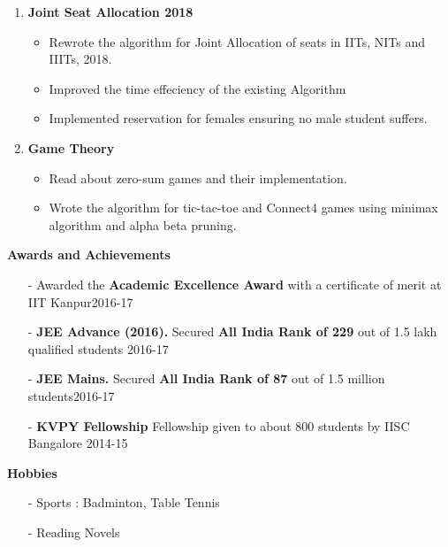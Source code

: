 \documentclass{article}
\begin{document}
\begin{flushleft}
\begin{enumerate}
  \item \textbf{Joint Seat Allocation 2018} \\
  \begin{itemize}
      \item Rewrote the algorithm for Joint Allocation of seats in IITs, NITs and IIITs, 2018.
      \item Improved the time effeciency of the existing Algorithm
      \item Implemented reservation for females ensuring no male student suffers.
  \end{itemize}
  \item \textbf{Game Theory} \\
  \begin{itemize}
      \item Read about zero-sum games and their implementation.
      \item Wrote the algorithm for tic-tac-toe and Connect4 games using minimax algorithm and alpha beta pruning.
  \end{itemize}
\end{enumerate}
\vspace{7mm}
\textbf{Awards and Achievements} \\
\begin{itemize}
    \item[-] Awarded the \textbf{Academic Excellence Award} with a certificate of merit at IIT Kanpur\hfill 2016-17\\[-0.6 cm]
    \item[-] \textbf{JEE Advance (2016).} Secured \textbf{All India Rank of 229} out of 1.5 lakh qualified students \hfill 2016-17\\[-0.6 cm]
    \item[-] \textbf{JEE Mains.} Secured \textbf{All India Rank of 87} out of 1.5 million students\hfill 2016-17\\ [-0.6 cm]
    \item[-] \textbf{KVPY Fellowship} Fellowship given to about 800 students by IISC Bangalore \hfill 2014-15\\
\end{itemize}
\vspace{7mm}
\textbf{Hobbies} \\
\begin{itemize}
    \item[-]  Sports : Badminton, Table Tennis
    \item[-]  Reading Novels
\end{itemize}

\end{flushleft}
\end{document}
